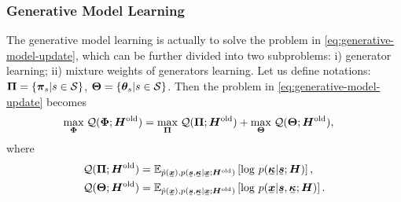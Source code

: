 \subsubsection{Generative Model Learning}
The generative model learning is actually to solve the problem in \eqref{eq:generative-model-update}, which can be further divided into two subproblems: i) generator learning; ii) mixture weights of generators learning. Let us define notations:
$\bm{\Pi} = \left\{  \bm{\pi}_{s}| s\in \mathcal{S} \right\}$, $\bm{\Theta}=\left\{ \bm{\theta}_s| s\in \mathcal{S} \right\}$. 
Then the problem in \eqref{eq:generative-model-update} becomes
\begin{align}\label{eq:sub-gm}
  &\underset{\bm{\Phi}}{\max}\; \mathcal{Q}(\bm{\Phi}; \bm{H}^{\mathrm{old}}) = \underset{\bm{\Pi}}{\max}\; \mathcal{Q}(\bm{\Pi}; \bm{H}^{\mathrm{old}}) + \underset{\bm{\Theta}}{\max}\; \mathcal{Q}(\bm{\Theta}; \bm{H}^{\mathrm{old}}),
\end{align}
where
\begin{align}
  \Qq(\bm{\Pi}; \bm{H}^{\mathrm{old}})  &=\EE_{\hat{p}(\ubm{x}),p(\ubm{s},\ubm{\kappa}| \ubm{x}; \bm{H}^{\mathrm{old}})}\left[  \log\,p(\ubm{\kappa}| \ubm{s}; \bm{H})\right], \\
  \Qq(\bm{\Theta}; \bm{H}^{\mathrm{old}}) &=\EE_{\hat{p}(\ubm{x}),p(\ubm{s},\ubm{\kappa}| \ubm{x}; \bm{H}^{\mathrm{old}})}\left[  \log\,p(\ubm{x}| \ubm{s},\ubm{\kappa}; \bm{H})\right].
\end{align}

